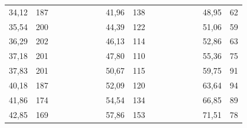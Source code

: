 \begin{enumerate}
\begin{table}[h!]
{\begin{tabular}{|cc|cccccccccccccccc}
					\multicolumn{1}{|c|}{34,12}    & 187               &  &  &  &  &  & \multicolumn{1}{c|}{} & \multicolumn{1}{c|}{41,96}    & \multicolumn{1}{c|}{138}               &  &  &  &  &  & \multicolumn{1}{c|}{} & \multicolumn{1}{c|}{48,95}    & \multicolumn{1}{c|}{62}                \\ \cline{1-2} \cline{9-10} \cline{17-18} 
					\multicolumn{1}{|c|}{35,54}    & 200               &  &  &  &  &  & \multicolumn{1}{c|}{} & \multicolumn{1}{c|}{44,39}    & \multicolumn{1}{c|}{122}               &  &  &  &  &  & \multicolumn{1}{c|}{} & \multicolumn{1}{c|}{51,06}    & \multicolumn{1}{c|}{59}                \\ \cline{1-2} \cline{9-10} \cline{17-18} 
					\multicolumn{1}{|c|}{36,29}    & 202               &  &  &  &  &  & \multicolumn{1}{c|}{} & \multicolumn{1}{c|}{46,13}    & \multicolumn{1}{c|}{114}               &  &  &  &  &  & \multicolumn{1}{c|}{} & \multicolumn{1}{c|}{52,86}    & \multicolumn{1}{c|}{63}                \\ \cline{1-2} \cline{9-10} \cline{17-18} 
					\multicolumn{1}{|c|}{37,18}    & 201               &  &  &  &  &  & \multicolumn{1}{c|}{} & \multicolumn{1}{c|}{47,80}    & \multicolumn{1}{c|}{110}               &  &  &  &  &  & \multicolumn{1}{c|}{} & \multicolumn{1}{c|}{55,36}    & \multicolumn{1}{c|}{75}                \\ \cline{1-2} \cline{9-10} \cline{17-18} 
					\multicolumn{1}{|c|}{37,83}    & 201               &  &  &  &  &  & \multicolumn{1}{c|}{} & \multicolumn{1}{c|}{50,67}    & \multicolumn{1}{c|}{115}               &  &  &  &  &  & \multicolumn{1}{c|}{} & \multicolumn{1}{c|}{59,75}    & \multicolumn{1}{c|}{91}                \\ \cline{1-2} \cline{9-10} \cline{17-18} 
					\multicolumn{1}{|c|}{40,18}    & 187               &  &  &  &  &  & \multicolumn{1}{c|}{} & \multicolumn{1}{c|}{52,09}    & \multicolumn{1}{c|}{120}               &  &  &  &  &  & \multicolumn{1}{c|}{} & \multicolumn{1}{c|}{63,64}    & \multicolumn{1}{c|}{94}                \\ \cline{1-2} \cline{9-10} \cline{17-18} 
					\multicolumn{1}{|c|}{41,86}    & 174               &  &  &  &  &  & \multicolumn{1}{c|}{} & \multicolumn{1}{c|}{54,54}    & \multicolumn{1}{c|}{134}               &  &  &  &  &  & \multicolumn{1}{c|}{} & \multicolumn{1}{c|}{66,85}    & \multicolumn{1}{c|}{89}                \\ \cline{1-2} \cline{9-10} \cline{17-18} 
					\multicolumn{1}{|c|}{42,85}    & 169               &  &  &  &  &  & \multicolumn{1}{c|}{} & \multicolumn{1}{c|}{57,86}    & \multicolumn{1}{c|}{153}               &  &  &  &  &  & \multicolumn{1}{c|}{} & \multicolumn{1}{c|}{71,51}    & \multicolumn{1}{c|}{78}                \\ \cline{1-2} \cline{9-10} \cline{17-18} 

\end{tabular}}
\end{table}
\end{enumerate}
